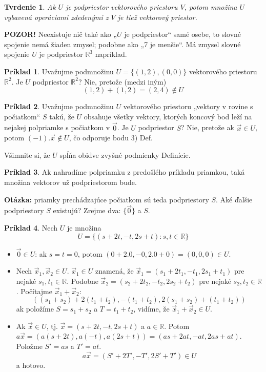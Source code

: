 \documentclass{article}
\theoremstyle{definition}
\newtheorem{priklad}{Príklad}[section]
\theoremstyle{plain}
\newtheorem{tvrdenie}{Tvrdenie}[section]
\begin{document}
\begin{tvrdenie}
Ak $U$ je podpriestor vektorového priestoru $V$, potom množina $U$ vybavená operáciami zdedenými z $V$ je tiež vektorový priestor.
\end{tvrdenie}

\textbf{POZOR!} Neexistuje nič také ako „$U$ je podpriestor“ samé osebe, to slovné spojenie nemá žiaden zmysel; podobne ako „7 je menšie“. Má zmysel slovné spojenie $U$ je podpriestor $\mathbb{R}^3$ napríklad.

\begin{priklad}
Uvažujme podmnožinu $U = \{(1,2), (0,0)\}$ vektorového priestoru $\mathbb{R}^2$.
Je $U$ podpriestor $\mathbb{R}^2$? Nie, pretože (medzi iným)
$$ (1,2) + (1,2) = (2,4) \notin U $$
\end{priklad}

\begin{priklad}
Uvažujme podmnožinu $U$ vektorového priestoru „vektory v rovine s počiatkom“ $S$ takú, že $U$ obsahuje všetky vektory, ktorých koncový bod leží na nejakej polpriamke s počiatkom v $\vec{0}$.
Je $U$ podpriestor $S$? Nie, pretože ak $\vec{x} \in U$, potom $(-1) . \vec{x} \notin U$, čo odporuje bodu 3) Def.
\end{priklad}

Všimnite si, že $U$ spĺňa obidve zvyšné podmienky Definície.

\begin{priklad}
Ak nahradíme polpriamku z predošlého príkladu priamkou, taká množina vektorov už podpriestorom bude.
\end{priklad}

\textbf{Otázka:} priamky prechádzajúce počiatkom sú teda podpriestory $S$. Aké ďalšie podpriestory $S$ existujú?
Zrejme dva: $\{\vec{0}\}$ a $S$.

\begin{priklad}
Nech $U$ je množina
$$ U = \{(s+2t, -t, 2s+t) : s, t \in \mathbb{R}\} $$
\begin{itemize}
    \item[1)] $\vec{0} \in U$: ak $s=t=0$, potom $(0+2.0, -0, 2.0+0) = (0,0,0) \in U$.
    \item[2)] Nech $\vec{x}_1, \vec{x}_2 \in U$.
    $\vec{x}_1 \in U$ znamená, že $\vec{x}_1 = (s_1+2t_1, -t_1, 2s_1+t_1)$ pre nejaké $s_1, t_1 \in \mathbb{R}$.
    Podobne $\vec{x}_2 = (s_2+2t_2, -t_2, 2s_2+t_2)$ pre nejaké $s_2, t_2 \in \mathbb{R}$.
    Počítajme $\vec{x}_1 + \vec{x}_2$:
    $$ ((s_1+s_2) + 2(t_1+t_2), -(t_1+t_2), 2(s_1+s_2) + (t_1+t_2)) $$
    ak položíme $S = s_1+s_2$ a $T = t_1+t_2$, vidíme, že $\vec{x}_1+\vec{x}_2 \in U$.
    \item[3)] Ak $\vec{x} \in U$, tj. $\vec{x} = (s+2t, -t, 2s+t)$ a $a \in \mathbb{R}$.
    Potom $a\vec{x} = (a(s+2t), a(-t), a(2s+t)) = (as+2at, -at, 2as+at)$.
    Položme $S' = as$ a $T' = at$.
    $$ a\vec{x} = (S'+2T', -T', 2S'+T') \in U $$
    a hotovo.
\end{itemize}
\end{priklad}
\end{document}

